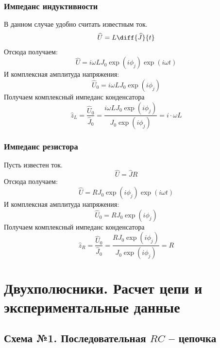 \subsubsection{Импеданс индуктивности}	

	В данном случае удобно считать известным ток.
	\begin{equation}
		\hat{U}=L\diff{\hat{J}}{t}
	\end{equation}
	Отсюда получаем:
	\begin{equation}
		\hat{U}=i\omega L J_0\exp(i\phi_j)\exp(i\omega t)
	\end{equation}
	И комплексная амплитуда напряжения:
	\begin{equation}
		\hat{U}_0=i\omega L J_0\exp(i\phi_j)
	\end{equation}
	Получаем комплексный импеданс конденсатора
	\begin{equation}
		\hat{z}_L=\frac{\hat{U}_0}{\hat{J}_0}=\frac{i\omega L J_0\exp(i\phi_j)}{J_0\exp(i\phi_j)}=i\cdot \omega L
	\end{equation}

\subsubsection{Импеданс резистора}	

	Пусть известен ток. 
	\begin{equation}
		\hat{U}=\hat{J}R
	\end{equation}
	Отсюда получаем:
	\begin{equation}
		\hat{U}=R J_0\exp(i\phi_j)\exp(i\omega t)
	\end{equation}
	И комплексная амплитуда напряжения:
	\begin{equation}
		\hat{U}_0=R J_0\exp(i\phi_j)
	\end{equation}
	Получаем комплексный импеданс конденсатора
	\begin{equation}
		\hat{z}_R=\frac{\hat{U}_0}{\hat{J}_0}=\frac{R J_0\exp(i\phi_j)}{J_0\exp(i\phi_j)}=R
	\end{equation}

\section{Двухполюсники. Расчет цепи и экспериментальные данные}
\subsection{Схема №1. Последовательная $RC$ -- цепочка}

